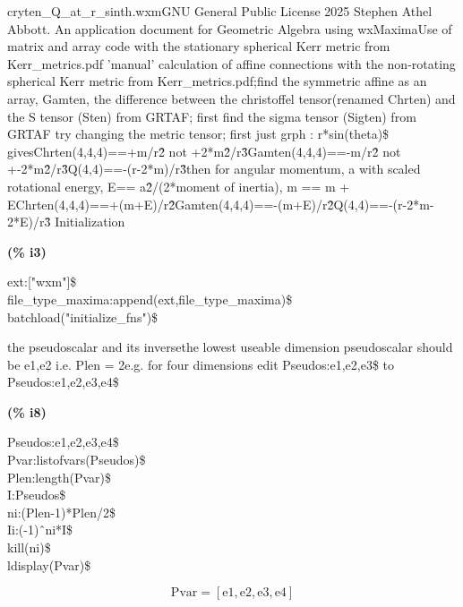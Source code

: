 \documentclass[fleqn]{article}
\begin{document}
cryten\_Q\_at\_r\_sinth.wxmGNU General Public License 2025  Stephen Athel Abbott.
An application document for Geometric Algebra using wxMaximaUse of matrix and array code with the stationary spherical Kerr metric from Kerr\_metrics.pdf
'manual' calculation of affine connections with the non-rotating spherical Kerr metric from Kerr\_metrics.pdf;find the symmetric affine as an array, Gamten, the difference between the christoffel tensor(renamed Chrten) and the S tensor (Sten) from GRTAF; first find the sigma tensor (Sigten) from GRTAF
try changing the metric tensor; first just grph : r*sin(theta)\$ givesChrten(4,4,4)==+m/r\^ 2 not +2*m\^ 2/r\^ 3Gamten(4,4,4)==-m/r\^ 2 not +-2*m\^ 2/r\^ 3Q(4,4)==-(r-2*m)/r\^ 3then for angular momentum, a with scaled rotational energy, E== a\^ 2/(2*moment of inertia), m == m + EChrten(4,4,4)==+(m+E)/r\^ 2Gamten(4,4,4)==-(m+E)/r\^ 2Q(4,4)==-(r-2*m-2*E)/r\^ 3
Initialization


\noindent
\begin{minipage}[t]{4.000000em}\color{red}\bfseries
(\% i3)	
\end{minipage}
\begin{minipage}[t]{\textwidth}\color{blue}
ext:["wxm"]\$\\
file\_type\_maxima:append(ext,file\_type\_maxima)\$\\
batchload("initialize\_fns")\$
\end{minipage}

\noindent%

the pseudoscalar and its inversethe lowest useable dimension pseudoscalar should be {e1,e2} i.e. Plen = 2e.g. for four dimensions edit Pseudos:{e1,e2,e3}\$ to Pseudos:{e1,e2,e3,e4}\$


\noindent
\begin{minipage}[t]{4.000000em}\color{red}\bfseries
(\% i8)	
\end{minipage}
\begin{minipage}[t]{\textwidth}\color{blue}
Pseudos:{e1,e2,e3,e4}\$\\
Pvar:listofvars(Pseudos)\$\\
Plen:length(Pvar)\$\\
I:Pseudos\$\\
ni:(Plen-1)*Plen/2\$\\
Ii:(-1)\^\ ni*I\$\\
kill(ni)\$\\
ldisplay(Pvar)\$
\end{minipage}
\[\displaystyle \tag{\% t8} 
\ensuremath{\mathrm{Pvar}}\mathop{=}\left[ \ensuremath{\mathrm{e1}}\mathop{,}\ensuremath{\mathrm{e2}}\mathop{,}\ensuremath{\mathrm{e3}}\mathop{,}\ensuremath{\mathrm{e4}}\right] \mbox{}
\]
\end{document}
